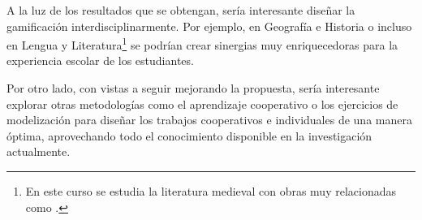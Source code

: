 A la luz de los resultados que se obtengan, sería interesante diseñar la gamificación interdisciplinarmente.
%
Por ejemplo, en Geografía e Historia o incluso en Lengua y Literatura\footnote{En este curso se estudia la literatura medieval con obras muy relacionadas como .} se podrían crear sinergias muy enriquecedoras para la experiencia escolar de los estudiantes.

Por otro lado, con vistas a seguir mejorando la propuesta, sería interesante explorar otras metodologías como el aprendizaje cooperativo o los ejercicios de modelización para diseñar los trabajos cooperativos e individuales de una manera óptima, aprovechando todo el conocimiento disponible en la investigación actualmente.
